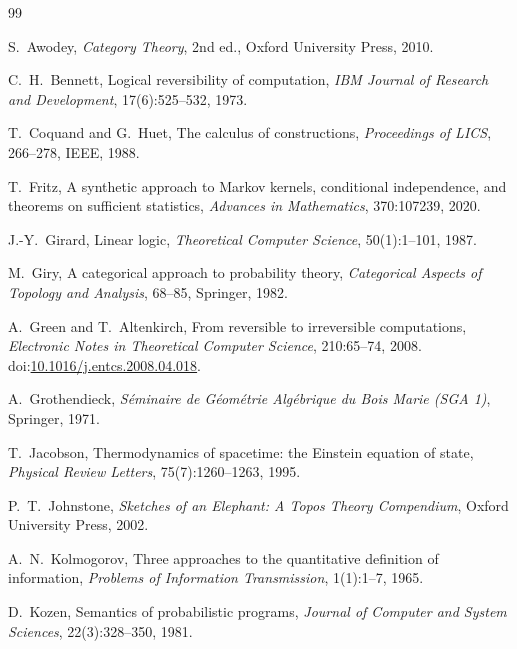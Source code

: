 \documentclass[12pt,a4paper]{article}
\theoremstyle{definition}
\theoremstyle{remark}
\begin{document}
\begin{thebibliography}{99}

S.~Awodey, \emph{Category Theory}, 2nd ed., Oxford University Press, 2010.

C.~H.~Bennett, Logical reversibility of computation,
\emph{IBM Journal of Research and Development}, 17(6):525--532, 1973.

T.~Coquand and G.~Huet, The calculus of constructions,
\emph{Proceedings of LICS}, 266--278, IEEE, 1988.

T.~Fritz, A synthetic approach to Markov kernels, conditional independence,
and theorems on sufficient statistics,
\emph{Advances in Mathematics}, 370:107239, 2020.

J.-Y.~Girard, Linear logic,
\emph{Theoretical Computer Science}, 50(1):1--101, 1987.

M.~Giry, A categorical approach to probability theory,
\emph{Categorical Aspects of Topology and Analysis}, 68--85, Springer, 1982.

A.~Green and T.~Altenkirch, From reversible to irreversible computations,
\emph{Electronic Notes in Theoretical Computer Science}, 210:65--74, 2008.
\newblock doi:\href{https://doi.org/10.1016/j.entcs.2008.04.018}{10.1016/j.entcs.2008.04.018}.

A.~Grothendieck, \emph{S\'eminaire de G\'eom\'etrie Alg\'ebrique du Bois Marie (SGA 1)},
Springer, 1971.

T.~Jacobson, Thermodynamics of spacetime: the Einstein equation of state,
\emph{Physical Review Letters}, 75(7):1260--1263, 1995.

P.~T.~Johnstone, \emph{Sketches of an Elephant: A Topos Theory Compendium},
Oxford University Press, 2002.

A.~N.~Kolmogorov, Three approaches to the quantitative definition of information,
\emph{Problems of Information Transmission}, 1(1):1--7, 1965.

D.~Kozen, Semantics of probabilistic programs,
\emph{Journal of Computer and System Sciences}, 22(3):328--350, 1981.


\end{thebibliography}
\end{document}
